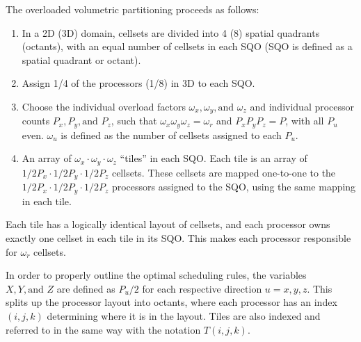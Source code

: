 \documentclass[11pt, letterpaper,titlepage,oneside]{article}
\begin{document}
The overloaded volumetric partitioning proceeds as follows:

\begin{enumerate}
\item In a 2D (3D) domain, cellsets are divided into 4 (8) spatial quadrants (octants), with an equal number of cellsets in each  SQO (SQO is defined as a spatial quadrant or octant).
\item Assign 1/4 of the processors (1/8) in 3D to each SQO. 
\item Choose the individual overload factors $\omega_x, \omega_y, \text{and } \omega_z$ and individual processor counts $P_x, P_y, \text{and }P_z$, such that $\omega_x \omega_y \omega_z = \omega_r$ and $P_x P_y P_z = P$, with all $P_u$ even. $\omega_u$ is defined as the number of cellsets assigned to each $P_u$.
\item An array of $\omega_x\cdot\omega_y\cdot\omega_z$ ``tiles'' in each SQO. Each tile is an array of $1/2 P_x \cdot 1/2 P_y \cdot 1/2 P_z$ cellsets. These cellsets are mapped one-to-one to the $1/2 P_x \cdot 1/2 P_y \cdot 1/2 P_z$ processors assigned to the SQO, using the same mapping in each tile.
\end{enumerate}
Each tile has a logically identical layout of cellsets, and each processor owns exactly one cellset in each tile in its SQO. This makes each processor responsible for $\omega_r$ cellsets.

In order to properly outline the optimal scheduling rules, the variables $X,Y, \text{and } Z$ are defined as $P_u/2$ for each respective direction $u = x,y,z$. This splits up the processor layout into octants, where each processor has an index $(i,j,k)$ determining where it is in the layout. Tiles are also indexed and referred to in the same way with the notation $T(i,j,k)$. 
\end{document}
